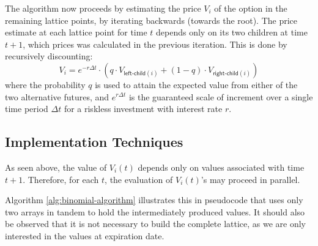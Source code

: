 The algorithm now proceeds by estimating the price $V_i$ of the option
in the remaining lattice points, by iterating backwards (towards the
root). The price estimate at each lattice point for time $t$ depends
only on its two children at time $t+1$, which prices was calculated in
the previous iteration. This is done by recursively discounting:
$$V_{i} = e^{-r\Delta t} \cdot (q\cdot V_{\mathsf{left\textsf{-}child}(i)} + (1-q)\cdot V_{\mathsf{right\textsf{-}child}(i)})$$
where the probability $q$ is used to attain the expected value from
either of the two alternative futures, and $e^{r\Delta t}$ is the
guaranteed scale of increment over a single time period $\Delta t$ for
a riskless investment with interest rate $r$.





\subsection{Implementation Techniques}
As seen above, the value of $V_i(t)$ depends only on values associated
with time $t+1$. Therefore, for each $t$, the evaluation of $V_i(t)$'s may
proceed in parallel.

Algorithm \ref{alg:binomial-algorithm} illustrates this in pseudocode
that uses only two arrays in tandem to hold the intermediately
produced values. It should also be observed that it is not necessary
to build the complete lattice, as we are only interested in the values
at expiration date.

